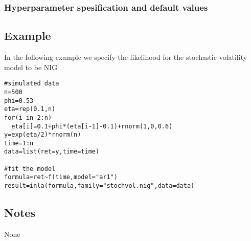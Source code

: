 \documentclass[a4paper,11pt]{article}
\begin{document}
\subsubsection*{Hyperparameter spesification and default values}





\subsection*{Example}
In the following example we specify the likelihood for the stochastic
volatility model to be NIG
 
\begin{verbatim}
#simulated data
n=500
phi=0.53
eta=rep(0.1,n)
for(i in 2:n)
  eta[i]=0.1+phi*(eta[i-1]-0.1)+rnorm(1,0,0.6)
y=exp(eta/2)*rnorm(n)
time=1:n
data=list(ret=y,time=time)

#fit the model
formula=ret~f(time,model="ar1")
result=inla(formula,family="stochvol.nig",data=data)
\end{verbatim}

\subsection*{Notes}

None
\end{document}

